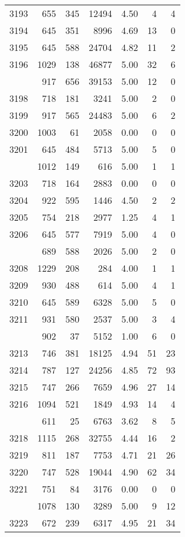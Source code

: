 \documentclass[
]{article}
\begin{document}
\begin{table}
\begin{tabular}[t]{lrrrrrr}
3193 & 655 & 345 & 12494 & 4.50 & 4 & 4\\
3194 & 645 & 351 & 8996 & 4.69 & 13 & 0\\
3195 & 645 & 588 & 24704 & 4.82 & 11 & 2\\
3196 & 1029 & 138 & 46877 & 5.00 & 32 & 6\\
\addlinespace
3197 & 917 & 656 & 39153 & 5.00 & 12 & 0\\
3198 & 718 & 181 & 3241 & 5.00 & 2 & 0\\
3199 & 917 & 565 & 24483 & 5.00 & 6 & 2\\
3200 & 1003 & 61 & 2058 & 0.00 & 0 & 0\\
3201 & 645 & 484 & 5713 & 5.00 & 5 & 0\\
\addlinespace
3202 & 1012 & 149 & 616 & 5.00 & 1 & 1\\
3203 & 718 & 164 & 2883 & 0.00 & 0 & 0\\
3204 & 922 & 595 & 1446 & 4.50 & 2 & 2\\
3205 & 754 & 218 & 2977 & 1.25 & 4 & 1\\
3206 & 645 & 577 & 7919 & 5.00 & 4 & 0\\
\addlinespace
3207 & 689 & 588 & 2026 & 5.00 & 2 & 0\\
3208 & 1229 & 208 & 284 & 4.00 & 1 & 1\\
3209 & 930 & 488 & 614 & 5.00 & 4 & 1\\
3210 & 645 & 589 & 6328 & 5.00 & 5 & 0\\
3211 & 931 & 580 & 2537 & 5.00 & 3 & 4\\
\addlinespace
3212 & 902 & 37 & 5152 & 1.00 & 6 & 0\\
3213 & 746 & 381 & 18125 & 4.94 & 51 & 23\\
3214 & 787 & 127 & 24256 & 4.85 & 72 & 93\\
3215 & 747 & 266 & 7659 & 4.96 & 27 & 14\\
3216 & 1094 & 521 & 1849 & 4.93 & 14 & 4\\
\addlinespace
3217 & 611 & 25 & 6763 & 3.62 & 8 & 5\\
3218 & 1115 & 268 & 32755 & 4.44 & 16 & 2\\
3219 & 811 & 187 & 7753 & 4.71 & 21 & 26\\
3220 & 747 & 528 & 19044 & 4.90 & 62 & 34\\
3221 & 751 & 84 & 3176 & 0.00 & 0 & 0\\
\addlinespace
3222 & 1078 & 130 & 3289 & 5.00 & 9 & 12\\
3223 & 672 & 239 & 6317 & 4.95 & 21 & 34\\

\end{tabular}
\end{table}
\end{document}
